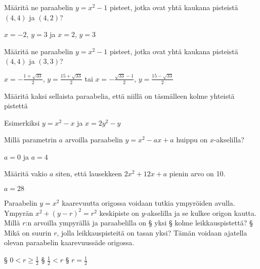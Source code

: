 \begin{tehtavasivu}
\begin{tehtava}
Määritä ne paraabelin $y=x^2-1$ pisteet, jotka ovat yhtä kaukana pisteistä $(4, 4)$ ja $(4, 2)$?
\begin{vastaus}
$x=-2$, $y=3$ ja $x=2$, $y=3$
\end{vastaus}
\end{tehtava}

\begin{tehtava}
Määritä ne paraabelin $y=x^2-1$ pisteet, jotka ovat yhtä kaukana pisteistä $(4, 4)$ ja $(3, 3)$?
\begin{vastaus}
$x = -\frac{1+\sqrt{33}}{2}$,   $y = \frac{15+\sqrt{33}}{2}$ tai $x = -\frac{\sqrt{33}-1}{2}$,   $y = \frac{15-\sqrt{33}}{2}$
\end{vastaus}
\end{tehtava}



\begin{tehtava}
Määritä kaksi sellaista paraabelia, että niillä on täsmälleen kolme yhteistä pistettä
\begin{vastaus}
Esimerkiksi $y=x^2-x$ ja  $x=2y^2-y$
\end{vastaus}
\end{tehtava}

\begin{tehtava}
Millä parametrin $a$ arvoilla paraabelin $y=x^2-ax+a$ huippu on $x$-akselilla?
\begin{vastaus}
$a=0$ ja $a=4$
\end{vastaus}
\end{tehtava}

\begin{tehtava}
Määritä vakio $a$ siten, että lausekkeen $2x^2+12x+a$ pienin arvo on 10.
\begin{vastaus}
$a=28$
\end{vastaus}
\end{tehtava}

\begin{tehtava}
Paraabelin $y = x^2$ kaarevuutta origossa voidaan tutkia ympyröiden avulla. Ympyrän $x^2+(y-r)^2=r^2$ keskipiste on $y$-akselilla ja se kulkee origon kautta. Millä $r$:n arvoilla ympyrällä ja paraabelilla on
\alakohdat
§ yksi
§ kolme leikkauspistettä?
§ Mikä on suurin $r$, jolla leikkauspisteitä on tasan yksi? Tämän voidaan ajatella olevan paraabelin kaarevuussäde origossa.
\loppu
\begin{vastaus}
\alakohdat
§ $0 < r \geq \frac{1}{2}$
§ $\frac{1}{2} < r $
§ $r = \frac{1}{2}$
\loppu
\end{vastaus}
\end{tehtava}

\end{tehtavasivu}

